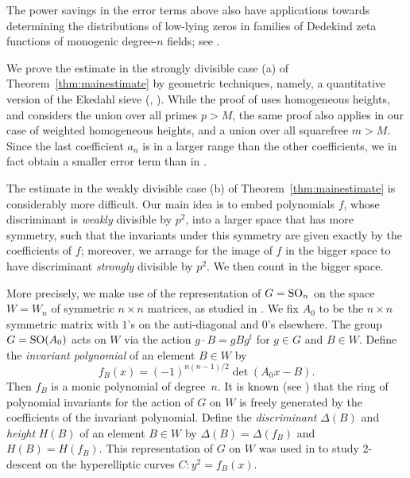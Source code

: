 \documentclass[11pt]{article}
\def\SO{{\rm SO}}
\begin{document}
The power savings in the error terms above also have applications towards
determining the distributions of low-lying zeros in families of
Dedekind zeta functions of monogenic degree-$n$ fields; see \cite[\S5.2]{SST}.

We prove the estimate in the strongly divisible case (a) of
Theorem~\ref{thm:mainestimate} by geometric techniques, namely, a
quantitative version of the Ekedahl sieve (\cite{Ek}, \cite[Theorem
  3.3]{geosieve}). While the proof of \cite[Theorem~3.3]{geosieve}
uses homogeneous heights, and considers the union over all primes
$p>M$, the same proof also applies in our case of weighted homogeneous
heights, and a union over all squarefree $m>M$. Since the last
coefficient $a_n$ is in a larger range than the other coefficients, we
in fact obtain a smaller error term than in \cite[Theorem~3.3]{geosieve}.

The estimate in the weakly divisible case (b) of
Theorem~\ref{thm:mainestimate} is considerably more difficult. Our
main idea is to embed polynomials $f$, whose discriminant is {\it weakly}
divisible by $p^2$, into a larger space that has more symmetry, such
that the invariants under this symmetry are given exactly by the
coefficients of $f$; moreover, we arrange for the image of $f$ in the
bigger space to have discriminant {\it strongly} divisible by $p^2$.  We
then count in the bigger space.

More precisely, we make use of the representation of $G=\SO_n$ on the
space $W=W_n$ of symmetric $n\times n$ matrices, as studied in
\cite{BG2,SW}. We fix $A_0$ to be the $n\times n$ symmetric matrix
with $1$'s on the anti-diagonal and $0$'s elsewhere. The group
$G=\SO(A_0)$ acts on $W$ via the action $g\cdot B=gBg^t$ for $g\in G$
and $B\in W$.  Define the {\it invariant polynomial} of an element
$B\in W$ by $$f_B(x) = (-1)^{n(n-1)/2}\det(A_0x - B).$$ Then $f_B$ is
a monic polynomial of degree~$n$. It is known (see \cite[\S 4]{AITBG})
that the ring of polynomial invariants for the action of $G$ on $W$ is
freely generated by the coefficients of the invariant
polynomial. Define the {\it discriminant} $\Delta(B)$ and {\it height}
$H(B)$ of an element $B\in W$ by $\Delta(B)=\Delta(f_B)$ and
$H(B)=H(f_B)$.  This representation of $G$ on $W$ was used in
\cite{BG2,SW} to study 2-descent on the hyperelliptic curves
$C:y^2=f_B(x)$.
\end{document}
